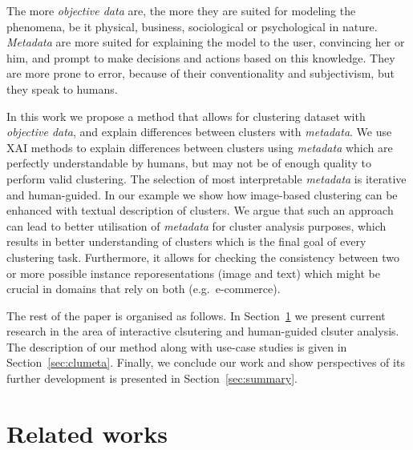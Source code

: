 \documentclass[
 twocolumn,
 hf,
]{ceurart}
\begin{document}
The more \textit{objective data} are, the more they are suited for modeling the phenomena, be it physical, business, sociological or psychological in nature.
\textit{Metadata} are more suited for explaining the model to the user, convincing her or him, and prompt to make decisions and actions based on this knowledge.
They are more prone to error, because of their conventionality and subjectivism, but they speak to humans.

In this work we propose a method that allows for clustering dataset with \textit{objective data}, and explain differences between clusters with \textit{metadata}.
We use XAI methods to explain differences between clusters using \textit{metadata} which are perfectly understandable by humans, but may not be of enough quality to perform valid clustering.
The selection of most interpretable \textit{metadata} is iterative and human-guided.
In our example we show how image-based clustering can be enhanced with textual description of clusters.
We argue that such an approach can lead to better utilisation of \textit{metadata} for cluster analysis purposes, which results in better understanding of clusters which is the final goal of every clustering task. %
Furthermore, it allows for checking the consistency between two or more possible instance reporesentations (image and text) which might be crucial in domains that rely on both (e.g.\ e-commerce).

The rest of the paper is organised as follows.
In Section~\ref{sec:sota} we present current research in the area of interactive clsutering and human-guided clsuter analysis.
The description of our method along with use-case studies is given in Section~\ref{sec:clumeta}.
Finally, we conclude our work and show perspectives of its further development is presented in Section~\ref{sec:summary}.

\section{Related works}
\label{sec:sota}
\end{document}
